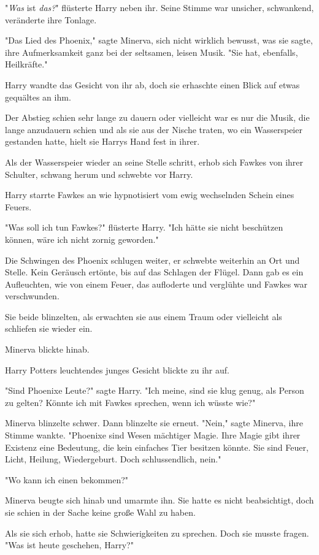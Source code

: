 {"\emph{Was} ist \emph{das?}" flüsterte Harry neben ihr. Seine Stimme war unsicher, schwankend, veränderte ihre Tonlage.

"Das Lied des Phoenix," sagte Minerva, sich nicht wirklich bewusst, was sie sagte, ihre Aufmerksamkeit ganz bei der seltsamen, leisen Musik. "Sie hat, ebenfalls, Heilkräfte."

Harry wandte das Gesicht von ihr ab, doch sie erhaschte einen Blick auf etwas gequältes an ihm.

Der Abstieg schien sehr lange zu dauern oder vielleicht war es nur die Musik, die lange anzudauern schien und als sie aus der Nische traten, wo ein Wasserspeier gestanden hatte, hielt sie Harrys Hand fest in ihrer.

Als der Wasserspeier wieder an seine Stelle schritt, erhob sich Fawkes von ihrer Schulter, schwang herum und schwebte vor Harry.

Harry starrte Fawkes an wie hypnotisiert vom ewig wechselnden Schein eines Feuers.

"Was soll ich tun Fawkes?" flüsterte Harry. "Ich hätte sie nicht beschützen können, wäre ich nicht zornig geworden."

Die Schwingen des Phoenix schlugen weiter, er schwebte weiterhin an Ort und Stelle. Kein Geräusch ertönte, bis auf das Schlagen der Flügel. Dann gab es ein Aufleuchten, wie von einem Feuer, das aufloderte und verglühte und Fawkes war verschwunden.

Sie beide blinzelten, als erwachten sie aus einem Traum oder vielleicht als schliefen sie wieder ein.

Minerva blickte hinab.

Harry Potters leuchtendes junges Gesicht blickte zu ihr auf.

"Sind Phoenixe Leute?" sagte Harry. "Ich meine, sind sie klug genug, als Person zu gelten? Könnte ich mit Fawkes sprechen, wenn ich wüsste wie?"

Minerva blinzelte schwer. Dann blinzelte sie erneut. "Nein," sagte Minerva, ihre Stimme wankte. "Phoenixe sind Wesen mächtiger Magie. Ihre Magie gibt ihrer Existenz eine Bedeutung, die kein einfaches Tier besitzen könnte. Sie sind Feuer, Licht, Heilung, Wiedergeburt. Doch schlussendlich, nein."

"Wo kann ich einen bekommen?"

Minerva beugte sich hinab und umarmte ihn. Sie hatte es nicht beabsichtigt, doch sie schien in der Sache keine große Wahl zu haben.

Als sie sich erhob, hatte sie Schwierigkeiten zu sprechen. Doch sie musste fragen. "Was ist heute geschehen, Harry?"

}
